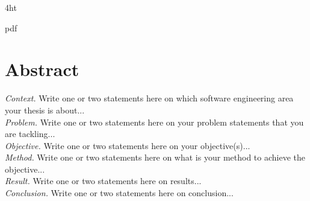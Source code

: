\documentclass[
  a4paper,  %
  twoside,  %
  bibliography=totoc,
  headsepline,
  cleardoublepage=empty,
  parskip=half,
  draft=false
]{scrbook}
\begin{document}
\iftex4ht
  \Configure{$}{\PicMath}{\EndPicMath}{}

  {pdf}
  {%
  }
\fi



\Titelblatt

\pagestyle{preamble}
\renewcommand*{\chapterpagestyle}{preamble}






\section*{Abstract}
\textit{Context.} Write one or two statements here on which software engineering area your thesis is about...\\
\textit{Problem.} Write one or two statements here on your problem statements that you are tackling...\\
\textit{Objective.} Write one or two statements here on your objective(s)...\\
\textit{Method.} Write one or two statements here on what is your method to achieve the objective...\\
\textit{Result.} Write one or two statements here on results...\\
\textit{Conclusion.} Write one or two statements here on conclusion...
\cleardoublepage
\end{document}
